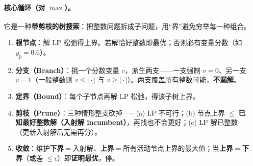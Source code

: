\documentclass[11pt]{ctexart}
\begin{document}
\paragraph{核心循环（对 $\max$）。}它是一种\textbf{带剪枝的树搜索}：把整数问题拆成子问题，用“界”避免穷举每一种组合。
\begin{enumerate}[leftmargin=2em,itemsep=2pt]
  \item \textbf{根节点}：解 LP 松弛得上界。若解恰好整数即最优；否则必有变量分数（如 $y_p=0.6$）。
  \item \textbf{分支（Branch）}：挑一个分数变量 $v$，派生两支——一支强制 $v=0$、另一支 $v=1$（一般整数则 $v\le\lfloor\cdot\rfloor$ 与 $v\ge\lceil\cdot\rceil$）。两支覆盖所有整数可能，\textbf{不漏解}。
  \item \textbf{定界（Bound）}：每个子节点再解 LP 松弛，得该子树上界。
  \item \textbf{剪枝（Prune）}：三种情形整支砍掉——(a) LP 不可行；(b) 节点上界 $\le$ \textbf{已知最好整数解（入射解 incumbent）}，再找也不会更好；(c) LP 解已整数（更新入射解后无需再分）。
  \item \textbf{收敛}：维护\textbf{下界}$=$入射解、\textbf{上界}$=$所有活动节点上界的最大值；当\textbf{上界$=$下界}（或差 $\le\epsilon$）即\textbf{证明最优}，停。
\end{enumerate}
\end{document}
